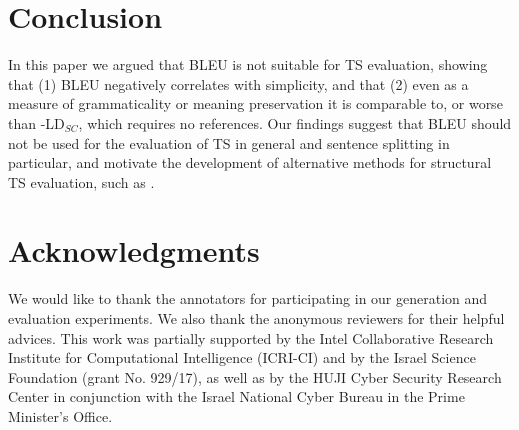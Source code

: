 \documentclass[11pt,a4paper]{article}
\begin{document}

\section{Conclusion} \label{sec:conclusion}

In this paper we argued that BLEU is not suitable for TS evaluation, showing 
that %
(1) BLEU negatively correlates with simplicity,
and that %
(2) even as a measure of grammaticality or meaning preservation it is
comparable to, or worse than -LD$_{SC}$, which requires no references.
Our findings suggest that BLEU should not be used for the evaluation of TS in general and sentence splitting in particular,
and motivate the development of alternative methods for structural TS evaluation, such as \citep{S18naacl}.

\section*{Acknowledgments}

We would like to thank the annotators for participating in our generation and evaluation experiments.
We also thank the anonymous reviewers for their helpful advices. This work was partially supported by the Intel Collaborative Research Institute for Computational Intelligence (ICRI-CI) and by the Israel Science Foundation
(grant No. 929/17), as well as by the HUJI Cyber Security Research
Center in conjunction with the Israel National Cyber
Bureau in the Prime Minister's Office.
\vspace{-0.5cm}



\end{document}
